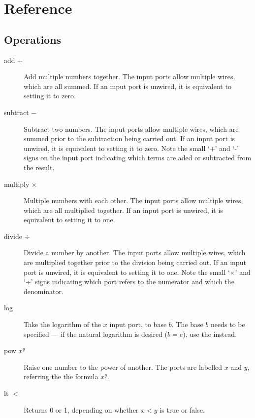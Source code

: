 \chapter{Reference}

\section{Operations}\label{operations}

\begin{description}

\item[add +]\label{op:add} Add multiple numbers together. The input ports allow
multiple wires, which are all summed. If an input port is unwired, it
is equivalent to setting it to zero.

\item[subtract $-$]\label{op:subtract} Subtract two numbers. The input ports
allow multiple wires, which are summed prior to the subtraction being
carried out. If an input port is unwired, it is equivalent to setting
it to zero. Note the small `+' and `-' signs on the input port
indicating which terms are aded or subtracted from the result.

\item[multiply $\times$]\label{op:multiply} Multiple numbers with each other. The input ports
allow multiple wires, which are all multiplied together. If an input
port is unwired, it is equivalent to setting it to one.

\item[divide $\div$]\label{op:divide} Divide a number by another. The input ports allow
multiple wires, which are multiplied together prior to the division
being carried out. If an input port is unwired, it is equivalent to
setting it to one. Note the small `$\times$' and `$\div$' signs indicating which
port refers to the numerator and which the denominator.

\item[log]\label{op:log} Take the logarithm of the $x$ input port, to
base $b$. The base $b$ needs to be specified --- if the natural
logarithm is desired ($b=e$), use the  instead.

\item[pow $x^y$]\label{op:pow} Raise one number to the power of another. The
ports are labelled $x$ and $y$, referring the the formula $x^y$.

\item[lt $<$]\label{op:lt} Returns 0 or 1, depending
  on whether $x<y$ is true or false.


\end{description}
